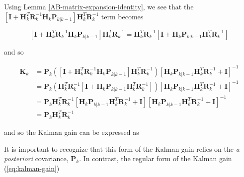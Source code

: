 Using Lemma \ref{AB-matrix-expansion-identity}, we see that the
$\left[ \mathbf{I} + \mathbf{H}_k^T \mathbf{R}_k^{-1} \mathbf{H}_k \mathbf{P}_{k|k-1} \right] \mathbf{H}_k^T \mathbf{R}_k^{-1}$
term becomes

\begin{equation*}
    \left[ \mathbf{I} + \mathbf{H}_k^T \mathbf{R}_k^{-1} \mathbf{H}_k \mathbf{P}_{k|k-1} \right] \mathbf{H}_k^T \mathbf{R}_k^{-1}
    = \mathbf{H}_k^T \mathbf{R}_k^{-1} \left[ \mathbf{I} + \mathbf{H}_k \mathbf{P}_{k|k-1} \mathbf{H}_k^T \mathbf{R}_k^{-1} \right]
\end{equation*}

and so

\begin{equation*}
    \begin{aligned}
        \mathbf{K}_k
        &= \mathbf{P}_k \left( \left[ \mathbf{I} + \mathbf{H}_k^T \mathbf{R}_k^{-1} \mathbf{H}_k \mathbf{P}_{k|k-1} \right]
        \mathbf{H}_k^T \mathbf{R}_k^{-1} \right) \left[ \mathbf{H}_k \mathbf{P}_{k|k-1} \mathbf{H}_k^T \mathbf{R}_k^{-1} + \mathbf{I} \right]^{-1} \\
        &= \mathbf{P}_k \left( \mathbf{H}_k^T \mathbf{R}_k^{-1} \left[ \mathbf{I} + \mathbf{H}_k \mathbf{P}_{k|k-1} \mathbf{H}_k^T \mathbf{R}_k^{-1} \right] \right)
        \left[ \mathbf{H}_k \mathbf{P}_{k|k-1} \mathbf{H}_k^T \mathbf{R}_k^{-1} + \mathbf{I} \right]^{-1} \\
        &= \mathbf{P}_k \mathbf{H}_k^T \mathbf{R}_k^{-1} \left[ \mathbf{H}_k \mathbf{P}_{k|k-1} \mathbf{H}_k^T \mathbf{R}_k^{-1} + \mathbf{I} \right]
        \left[ \mathbf{H}_k \mathbf{P}_{k|k-1} \mathbf{H}_k^T \mathbf{R}_k^{-1} + \mathbf{I} \right]^{-1} \\
        &= \mathbf{P}_k \mathbf{H}_k^T \mathbf{R}_k^{-1}
    \end{aligned}
\end{equation*}

and so the Kalman gain can be expressed as


It is important to recognize that this form of the Kalman gain relies on the
\textit{a posteriori} covariance, $\mathbf{P}_k$. In contrast, the regular form of the
Kalman gain (\ref{eq:kalman-gain})

